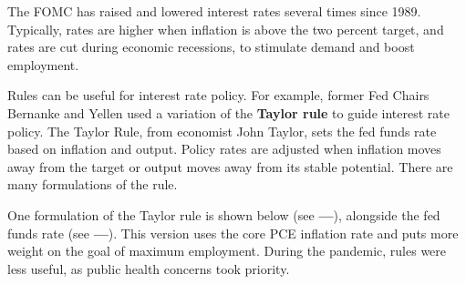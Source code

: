 \begin{minipage}{0.76\textwidth}   
\small The FOMC has raised and lowered interest rates several times since 1989. Typically, rates are higher when inflation is above the two percent target, and rates are cut during economic recessions, to stimulate demand and boost employment. 

Rules can be useful for interest rate policy. For example, former Fed Chairs Bernanke and Yellen used a variation of the \textbf{Taylor rule} to guide interest rate policy. The Taylor Rule, from economist John Taylor, sets the fed funds rate based on inflation and output. Policy rates are adjusted when inflation moves away from the target or output moves away from its stable potential. There are many formulations of the rule. 

One formulation of the Taylor rule is shown below (see {\color{lightcyan}\textbf{---}}), alongside the fed funds rate (see {\color{steelblue}\textbf{---}}). This version uses the core PCE inflation rate and puts more weight on the goal of maximum employment. During the pandemic, rules were less useful, as public health concerns took priority. 

\vspace{2.8cm}

\hspace{5mm} 


\small 
\end{minipage}
\vspace{-1mm}

